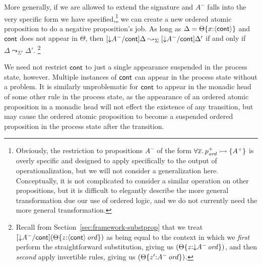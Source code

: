 More generally, if we are allowed to extend the signature and $A^-$
falls into the very specific form we have
specified,\footnote{Obviously, the restriction to propositions $A^-$
  of the form $\forall \overline{x}.\,p^+_{\it ord} \rightarrowtail \{ A^+ \}$ is
  overly specific and designed to apply specifically to the output of
  operationalization, but we will not consider a generalization here.
  Conceptually, it is not complicated to consider a similar operation
  on other propositions, but it is difficult to elegantly describe the
  more general transformation due our use of ordered logic, and we do
  not currently need the more general transformation.}  we can create
a new ordered atomic proposition to do a negative proposition's
job. As long as $\Delta = {\Theta}\{{x{:}\langle {\sf cont} \rangle}\}$ and
${\sf cont}$ does not appear in $\Theta$, then $[{\downarrow}A^- /{\sf
  cont}]\Delta \leadsto_\Sigma [{\downarrow}A^- /{\sf cont}]\Delta'$
if and only if $\Delta \leadsto_{\Sigma'} \Delta'$. \footnote{Recall
  from Section~\ref{sec:framework-substprop} that we treat
  $[{\downarrow}A^-/{\sf cont}]({\Theta}\{{z{:}{\langle {\sf cont} \rangle}\,{{\it ord}}}\})$
  as being equal to the context in which we {\it first} perform the
  straightforward substitution, giving us
  $({\Theta}\{{z{:}{{\downarrow}A^-}\,{{\it ord}}}\})$, and then {\it
    second} apply invertible rules, giving us
  $({\Theta}\{{z'{:}{A^-}\,{{\it ord}}}\})$.} 

We need not restrict ${\sf cont}$ to just a single appearance
suspended in the process state, however. Multiple instances of ${\sf
  cont}$ can appear in the process state without a problem.  It is
similarly unproblematic for ${\sf cont}$ to appear in the monadic head
of some other rule in the process state, as the appearance of an
ordered atomic proposition in a monadic head will not effect the
existence of any transition, but may cause the ordered atomic
proposition to become a suspended ordered proposition in the process
state after the transition. 


